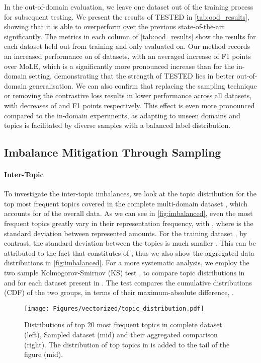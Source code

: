 \documentclass[11pt]{article}
\begin{document}
In the out-of-domain evaluation, we leave one dataset out of the training process for subsequent testing. We present the results of TESTED in \autoref{tab:ood_results}, showing that it is able to overperform over the previous state-of-the-art significantly. The metrics in each column of \autoref{tab:ood_results} show the results for each dataset held out from training and only evaluated on. Our method records an increased performance on  of  datasets, with an averaged increase of  F1 points over MoLE, which is a significantly more pronounced increase than for the in-domain setting, demonstrating that the strength of TESTED lies in better out-of-domain generalisation. We can also confirm that replacing the sampling technique or removing the contrastive loss results in lower performance across all datasets, with decreases of  and  F1 points respectively. This effect is even more pronounced compared to the in-domain experiments, as adapting to unseen domains and topics is facilitated by diverse samples with a balanced label distribution.  


\subsection{Imbalance Mitigation Through Sampling}
\label{subsec:imbalance}
\paragraph{Inter-Topic}
To investigate the inter-topic imbalances, we look at the topic distribution for the top  most frequent topics covered in the complete multi-domain dataset , which accounts for  of the overall data. As we can see in  \autoref{fig:imbalanced}, even the most frequent topics greatly vary in their representation frequency, with , where  is the standard deviation between represented amounts. For the training dataset , by contrast, the standard deviation between the topics is much smaller . This can be attributed to the fact that  constitutes   of , thus we also show the aggregated data distributions in \autoref{fig:imbalanced}. 
For a more systematic analysis, we employ the two sample Kolmogorov-Smirnov (KS) test \citep{kalmagorov}, to compare topic distributions in  and   for each dataset present in . The test compares the cumulative distributions (CDF) of the two groups, in terms of their maximum-absolute difference, .

\begin{figure*}
\centering
\texttt{[image: Figures/vectorized/topic\_distribution.pdf]}
\caption{Distributions of top 20 most frequent topics in complete dataset  (left), Sampled dataset  (mid) and their aggregated comparison (right). The distribution of top  topics in  is added to the tail of the figure (mid). 
}
\label{fig:imbalanced}
\end{figure*}
\end{document}
